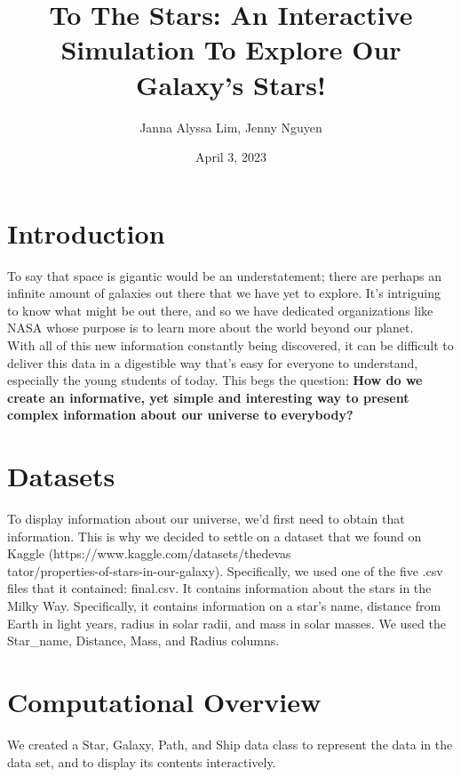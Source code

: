 \documentclass[fontsize=11pt]{article}
\title{To The Stars: An Interactive Simulation To Explore Our Galaxy's Stars!}
\author{Janna Alyssa Lim, Jenny Nguyen}
\date{April 3, 2023}
\begin{document}
\maketitle

\section*{Introduction}
To say that space is gigantic would be an understatement; there are perhaps an infinite amount of galaxies out there that we have yet to explore. It’s intriguing to know what might be out there, and so we have dedicated organizations like NASA whose purpose is to learn more about the world beyond our planet.\\

With all of this new information constantly being discovered, it can be difficult to deliver this data in a digestible way that’s easy for everyone to understand, especially the young students of today. This begs the question: \textbf{How do we create an informative, yet simple and interesting way to present complex information about our universe to everybody?}


\section*{Datasets}
To display information about our universe, we’d first need to obtain that information. This is why we decided to settle on a dataset that we found on Kaggle (https://www.kaggle.com/datasets/thedevas\\tator/properties-of-stars-in-our-galaxy). Specifically, we used one of the five .csv files that it contained: final.csv. It contains information about the stars in the Milky Way. Specifically, it contains information on a star’s name, distance from Earth in light years, radius in solar radii, and mass in solar masses. We used the Star\_name, Distance, Mass, and Radius columns.


\section*{Computational Overview}
We created a Star, Galaxy, Path, and Ship data class to represent the data in the data set, and to display its contents interactively.\\
\end{document}
